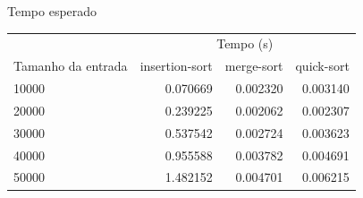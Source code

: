 \centering
\caption{Tempo esperado}
\begin{center}
\begin{tabular}{| l | r | r | r |}
\hline
& \multicolumn{3}{c|}{Tempo (s)}\\
\cline{2 - 4}
Tamanho da entrada & insertion-sort & merge-sort & quick-sort \\
\hline
10000 & 0.070669 & 0.002320 & 0.003140\\
20000 & 0.239225 & 0.002062 & 0.002307\\
30000 & 0.537542 & 0.002724 & 0.003623\\
40000 & 0.955588 & 0.003782 & 0.004691\\
50000 & 1.482152 & 0.004701 & 0.006215\\
\hline
\end{tabular}
\end{center}